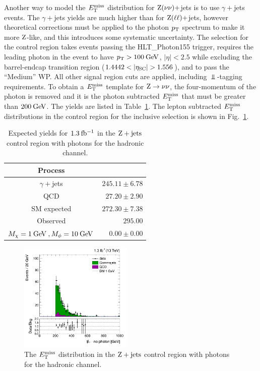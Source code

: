 Another way to model the $E_\mathrm{T}^{\mathrm{miss}}$ distribution for $\mathrm{Z}(\nu\nu)+$jets is to use $\gamma+$jets events. The $\gamma+$jets yields are much higher than for $\mathrm{Z}(\ell\ell)+$jets, however theoretical corrections must be applied to the photon $p_\mathrm{T}$ spectrum to make it more $\mathrm{Z}$-like, and this introduces some systematic uncertainty. The selection for the control region takes events passing the HLT\_Photon155 trigger, requires the leading photon in the event to have $p_\mathrm{T}>100\:\mathrm{Ge\kern -0.1em V}$, $|\eta|<2.5$ while excluding the barrel-endcap transition region ($1.4442<|\eta_{\mbox{\scriptsize{SC}}}|>1.556$), and to pass the ``Medium'' WP. All other signal region cuts are applied, including $\Bot$-tagging requirements. To obtain a $E_\mathrm{T}^{\mathrm{miss}}$ template for $\mathrm{Z}\rightarrow\nu\nu$, the four-momentum of the photon is removed and it is the photon subtracted $E_\mathrm{T}^{\mathrm{miss}}$ that must be greater than $200\:\mathrm{Ge\kern -0.1em V}$. The yields are listed in Table~\ref{tab:hadronic_bkg_pho_yields}. The lepton subtracted $E_\mathrm{T}^{\mathrm{miss}}$ distributions in the control region for the inclusive selection is shown in Fig.~\ref{fig:incl_hadronic_pho_fmet}.

\begin{table}[!ht]
\centering
\begin{tabular}{|c|r|}
\hline
  Process & \\
\hline
  $\gamma+$jets  & $245.11 \pm 6.78$ \\
  QCD                   & $27.20 \pm 2.90$  \\
\hline
SM expected     & $272.30 \pm 7.38$ \\
 \hline
  Observed        & $295.00 $ \\
\hline
  $M_\chi=1\:\mathrm{Ge\kern -0.1em V}\:, M_\phi=10\:\mathrm{Ge\kern -0.1em V}\:$       & $  0.00 \pm 0.00$ \\
\hline
\end{tabular}

\caption{Expected yields for $1.3\:\mathrm{fb^{-1}}$ in the $\mathrm{Z+jets}$ control region with photons for the hadronic channel.}
\label{tab:hadronic_bkg_pho_yields}
\end{table}
\begin{figure}[htbp]
  \centering
  \includegraphics[width=0.48\textwidth]{figures/hPFMETnopholinear_CRzjets.png}
  \caption{The $E_\mathrm{T}^{\mathrm{miss}}$ distribution in the $\mathrm{Z+jets}$ control region with photons for the hadronic channel.}
  \label{fig:incl_hadronic_pho_fmet}
\end{figure}

